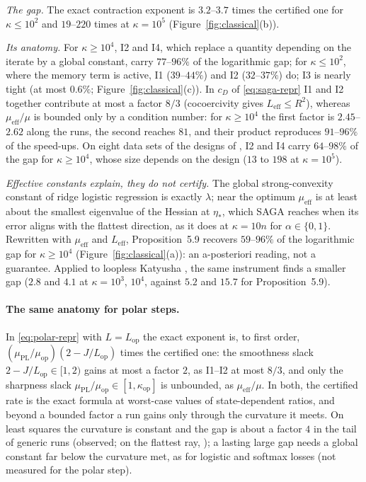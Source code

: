 \documentclass[10pt]{article}
\theoremstyle{remark}
\newcommand{\Lop}{L_{\mathrm{op}}}
\newcommand{\muop}{\mu_{\mathrm{op}}}
\newcommand{\kop}{\kappa_{\mathrm{op}}}
\newcommand{\etas}{\eta_\ast}
\newcommand{\muEff}{\mu_{\mathrm{eff}}}
\newcommand{\LEff}{L_{\mathrm{eff}}}
\newcommand{\muPL}{\mu_{\mathrm{PL}}}
\begin{document}
\begin{description}[leftmargin=2.3em,labelwidth=2.0em,labelsep=0.3em,itemsep=1pt,topsep=3pt,parsep=0pt,font=\normalfont\bfseries]
\item[(C1)] \emph{The gap.} The exact contraction exponent is $3.2$--$3.7$ times the certified one for $\kappa\le10^2$
and $19$--$220$ times at $\kappa=10^5$ (Figure~\ref{fig:classical}(b)).
\item[(C2)] \emph{Its anatomy.} For $\kappa\ge10^4$, I2 and I4, which replace a quantity depending on the iterate by a
global constant, carry $77$--$96\%$ of the logarithmic gap; for $\kappa\le10^2$, where the memory term is active, I1
($39$--$44\%$) and I2 ($32$--$37\%$) do; I3 is nearly tight (at most $0.6\%$; Figure~\ref{fig:classical}(c)). In
$c_D$ of \eqref{eq:saga-repr} I1 and I2 together contribute at most a factor $8/3$ (cocoercivity gives $\LEff\le R^2$), whereas
$\muEff/\mu$ is bounded only by a condition number: for $\kappa\ge10^4$ the first factor is $2.45$--$2.62$ along the runs,
the second reaches $81$, and their product reproduces $91$--$96\%$ of the speed-ups. On eight data sets of the designs
of \cite{na2023hessian}, I2 and I4 carry $64$--$98\%$ of the gap for $\kappa\ge10^4$, whose size depends on the design ($13$ to $198$ at
$\kappa=10^5$).
\item[(C3)] \emph{Effective constants explain, they do not certify.} The global strong-convexity constant of ridge
logistic regression is exactly $\lambda$; near the optimum $\muEff$ is at least about the smallest eigenvalue of the
Hessian at $\etas$, which SAGA reaches when its error aligns with the flattest direction, as it does at $\kappa=10n$ for
$\alpha\in\{0,1\}$. Rewritten with $\muEff$ and $\LEff$, Proposition~5.9 recovers $59$--$96\%$ of the logarithmic gap for
$\kappa\ge10^4$ (Figure~\ref{fig:classical}(a)): an a-posteriori reading, not a guarantee. Applied to loopless Katyusha
\cite{kovalev2020dont}, the same instrument finds a smaller gap ($2.8$ and $4.1$ at $\kappa=10^3$, $10^4$, against $5.2$
and $15.7$ for Proposition~5.9).
\end{description}

\paragraph{The same anatomy for polar steps.} In \eqref{eq:polar-repr} with $L=\Lop$ the exact exponent is, to first
order, $(\muPL/\muop)(2-J/\Lop)$ times the certified one: the smoothness slack $2-J/\Lop\in[1,2)$ gains at most a factor
$2$, as I1--I2 at most $8/3$, and only the sharpness slack $\muPL/\muop\in[1,\kop]$ is unbounded, as $\muEff/\mu$. In
both, the certified rate is the exact formula at worst-case values of state-dependent ratios, and beyond a bounded factor
a run gains only through the curvature it meets. On least squares the curvature is constant and the gap is about a
factor $4$ in the tail of generic runs (observed; on the flattest ray, \cite{shulgin2026quadratic}); a lasting large gap needs a global constant far
below the curvature met, as for logistic and softmax losses (not measured for the polar step).
\end{document}
